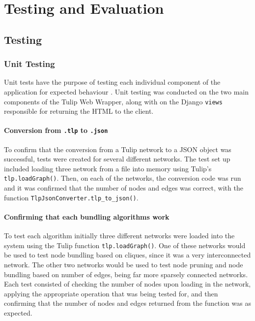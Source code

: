 \documentclass[../dissertation.tex]{subfiles}
\begin{document}
\chapter{Testing and Evaluation}
\label{chap:testing-eval}

\section{Testing}

\subsection{Unit Testing}

Unit tests have the purpose of testing each individual component of the application for expected behaviour \cite{runeson2006survey}. Unit testing was conducted on the two main components of the Tulip Web Wrapper, along with on the Django \texttt{views} responsible for returning the HTML to the client. 

\subsubsection{Conversion from \texttt{.tlp} to \texttt{.json}}

To confirm that the conversion from a Tulip network to a JSON object was successful, tests were created for several different networks. The test set up included loading three network from a file into memory using Tulip's \texttt{tlp.loadGraph()}. Then, on each of the networks, the conversion code was run and it was confirmed that the number of nodes and edges was correct, with the function \texttt{TlpJsonConverter.tlp\_to\_json()}.

\subsubsection{Confirming that each bundling algorithms work}

To test each algorithm initially three different networks were loaded into the system using the Tulip function \texttt{tlp.loadGraph()}. One of these networks would be used to test node bundling based on cliques, since it was a very interconnected network. The other two networks would be used to test node pruning and node bundling based on number of edges, being far more sparsely connected networks. Each test consisted of checking the number of nodes upon loading in the network, applying the appropriate operation that was being tested for, and then confirming that the number of nodes and edges returned from the function was as expected.
\end{document}
